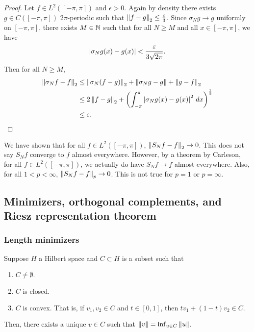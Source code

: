 \documentclass[a4paper]{article}
\begin{document}
\begin{proof}
  Let $f \in L^2([-\pi, \pi])$ and $\epsilon > 0$.
  Again by density there exists $g \in C([-\pi, \pi])$
  $2\pi$-periodic such that $\left\lVert f - g\right\rVert_2 \leq
    \frac{\varepsilon}{3}$. Since $\sigma_N g \to g$ uniformly
  on $[-\pi, \pi]$, there exists $M \in \mathbb{N}$ such that
  for all $N \geq M$ and all $x \in [-\pi, \pi]$, we have
  \[
    \left\lvert \sigma_N g(x) - g(x)\right\rvert < \frac{\varepsilon}{3 \sqrt{2 \pi}}.
  \]
  Then for all $N \geq M$,
  \[
    \begin{aligned}
      \left\lVert \sigma_N f - f\right\rVert_2
       & \leq \left\lVert \sigma_N (f - g)\right\rVert_2 + \left\lVert \sigma_N g - g\right\rVert
      + \left\lVert g - f\right\rVert_2                                                                           \\
       & \leq 2 \left\lVert f - g\right\rVert_2 + \left( \int_{-\pi}^{\pi} \left\lvert \sigma_N g(x)
                                                            - g(x)\right\rvert^2 \, d x \right)^{\frac{1}{2}} \\
       & \leq \varepsilon.
    \end{aligned}
  \]
\end{proof}

\begin{remark}
  We have shown that for all $f \in L^2([-\pi, \pi])$,
  $\left\lVert S_N f - f\right\rVert_2 \to 0$. This does not say $S_N f$
  converge to $f$ almost everywhere. However, by a theorem
  by Carleson, for all $f \in L^2([-\pi, \pi])$,
  we actually do have $S_N f \to f$ almost everywhere.
  Also, for all $1 < p < \infty$, $\left\lVert S_N f - f\right\rVert_p \to 0$.
  This is not true for $p = 1$ or $p = \infty$.
\end{remark}

\subsection{Minimizers, orthogonal complements, and
  Riesz representation theorem}

\subsubsection*{Length minimizers}

\begin{thm}
  Suppose $H$ a Hilbert space and $C \subset H$ is a subset
  such that
  \begin{enumerate}
    \item $C \neq \emptyset$.
    \item $C$ is closed.
    \item $C$ is convex. That is, if $v_1, v_2 \in C$
          and $t \in [0, 1]$, then $tv_1 + (1 - t)v_2 \in C$.
  \end{enumerate}
  Then, there exists a unique $v \in C$ such that
  $\left\lVert v\right\rVert = \inf_{u \in C} \left\lVert u\right\rVert$.
\end{thm}
\end{document}
